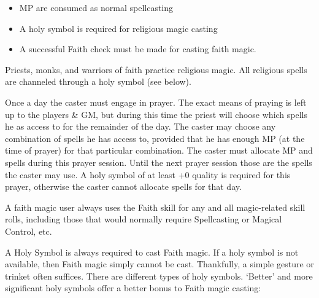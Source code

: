 \documentclass[twoside]{book}
\begin{document}
\begin{itemize}
      
  \item   MP are consumed as normal spellcasting 
  \item   A holy symbol is required for religious magic
                 casting 
  \item   A successful Faith check must be made for casting
                 faith magic. 
\end{itemize}
  
    {  
      Priests, monks, and warriors of faith practice
               religious magic. All religious spells are channeled
               through a holy symbol (see below). 
    }
  
    {  
      Once a day the caster must engage in prayer. The
               exact means of praying is left up to the players \& GM,
               but during this time the priest will choose which spells
               he as access to for the remainder of the day. The caster
               may choose any combination of spells he has access to,
               provided that he has enough MP (at the time of prayer) for
               that particular combination. The caster must allocate MP
               and spells during this prayer session. Until the next
               prayer session those are the spells the caster may use. A
               holy symbol of at least +0 quality is required for this
               prayer, otherwise the caster cannot allocate spells for
               that day. 
    }
  
    {  
      A faith magic user always uses the Faith skill for
               any and all magic-related skill rolls, including those
               that would normally require Spellcasting or Magical
               Control, etc. 
    }
  
    {  
      A Holy Symbol is always required to cast Faith
               magic. If a holy symbol is not available, then Faith magic
               simply cannot be cast. Thankfully, a simple gesture or
               trinket often suffices. There are different types of holy
               symbols. `Better' and more significant holy
               symbols offer a better bonus to Faith magic casting:
               
    }
  
\end{document}
